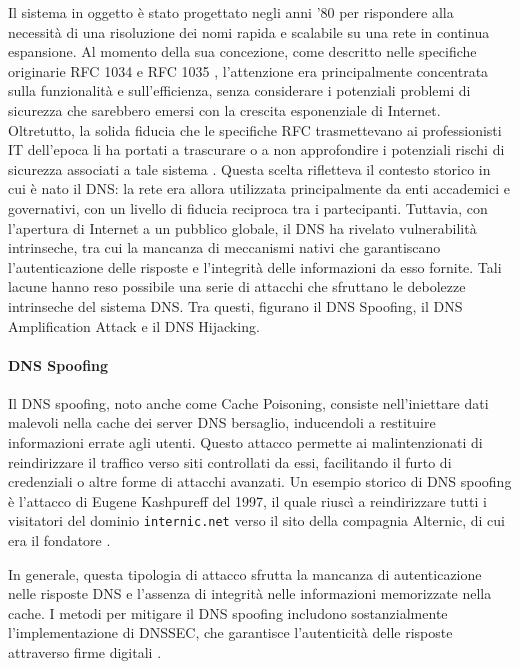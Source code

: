 Il sistema in oggetto è stato progettato negli anni '80 per rispondere alla necessità di una risoluzione dei nomi rapida e scalabile su una rete in continua espansione. Al momento della sua concezione, come descritto nelle specifiche originarie RFC 1034 \cite{DBLP:journals/rfc/rfc1034} e RFC 1035 \cite{DBLP:journals/rfc/rfc1035}, l'attenzione era principalmente concentrata sulla funzionalità e sull'efficienza, senza considerare i potenziali problemi di sicurezza che sarebbero emersi con la crescita esponenziale di Internet. Oltretutto, la solida fiducia che le specifiche RFC trasmettevano ai professionisti IT dell’epoca li ha portati a trascurare o a non approfondire i potenziali rischi di sicurezza associati a tale sistema \cite{hudaib2014dns}. Questa scelta rifletteva il contesto storico in cui è nato il DNS: la rete era allora utilizzata principalmente da enti accademici e governativi, con un livello di fiducia reciproca tra i partecipanti. Tuttavia, con l'apertura di Internet a un pubblico globale, il DNS ha rivelato vulnerabilità intrinseche, tra cui la mancanza di meccanismi nativi che garantiscano l'autenticazione delle risposte e l'integrità delle informazioni da esso fornite. Tali lacune hanno reso possibile una serie di attacchi che sfruttano le debolezze intrinseche del sistema DNS. Tra questi, figurano il DNS Spoofing, il DNS Amplification Attack e il DNS Hijacking.

\paragraph{DNS Spoofing}\label{paragraph:dns_spoofing}
Il DNS spoofing, noto anche come Cache Poisoning, consiste nell'iniettare dati malevoli nella cache dei server DNS bersaglio, inducendoli a restituire informazioni errate agli utenti. Questo attacco permette ai malintenzionati di reindirizzare il traffico verso siti controllati da essi, facilitando il furto di credenziali o altre forme di attacchi avanzati. Un esempio storico di DNS spoofing è l'attacco di Eugene Kashpureff del 1997, il quale riuscì a reindirizzare tutti i visitatori del dominio \texttt{internic.net} verso il sito della compagnia Alternic, di cui era il fondatore \cite{lioy2000dns}.

In generale, questa tipologia di attacco sfrutta la mancanza di autenticazione nelle risposte DNS e l'assenza di integrità nelle informazioni memorizzate nella cache. I metodi per mitigare il DNS spoofing includono sostanzialmente l'implementazione di DNSSEC, che garantisce l'autenticità delle risposte attraverso firme digitali \cite{DBLP:journals/rfc/rfc2535}.

